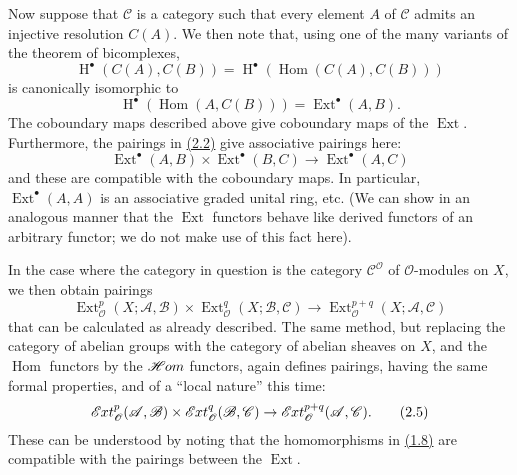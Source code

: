 \documentclass{article}
\newcommand{\oldpage}[1]{\marginpar{\footnotesize$\Big\vert$ \textit{p.~#1}}}
\theoremstyle{definition}
\theoremstyle{definition}
\theoremstyle{definition}
\theoremstyle{definition}
\theoremstyle{remark}
\begin{document}
\oldpage{149-04}Now suppose that \({\mathcal{C}}\) is a category such that every element \(A\) of \({\mathcal{C}}\) admits an injective resolution \(C(A)\).
We then note that, using one of the many variants of the theorem of bicomplexes,
\[
  \operatorname{H}^\bullet(C(A),C(B)) = \operatorname{H}^\bullet(\operatorname{Hom}(C(A),C(B)))
\]
is canonically isomorphic to
\[
  \operatorname{H}^\bullet(\operatorname{Hom}(A,C(B))) = \operatorname{Ext}^\bullet(A,B).
\]
The coboundary maps described above give coboundary maps of the \(\operatorname{Ext}\).
Furthermore, the pairings in \protect\hyperlink{fga-1-equation-2.2}{(2.2)} give associative pairings here:
\[
  \operatorname{Ext}^\bullet(A,B)\times\operatorname{Ext}^\bullet(B,C) \to \operatorname{Ext}^\bullet(A,C)
\tag{2.3}
\]
and these are compatible with the coboundary maps.
In particular, \(\operatorname{Ext}^\bullet(A,A)\) is an associative graded unital ring, etc.
(We can show in an analogous manner that the \(\operatorname{Ext}\) functors behave like derived functors of an arbitrary functor;
we do not make use of this fact here).

In the case where the category in question is the category \({\mathcal{C}}^{\mathscr{O}}\) of \({\mathscr{O}}\)-modules on \(X\), we then obtain pairings
\[
  \operatorname{Ext}_{\mathscr{O}}^p(X;{\mathscr{A}},{\mathscr{B}})\times\operatorname{Ext}_{\mathscr{O}}^q(X;{\mathscr{B}},{\mathscr{C}}) \to \operatorname{Ext}_{\mathscr{O}}^{p+q}(X;{\mathscr{A}},{\mathscr{C}})
\tag{2.4}
\]
that can be calculated as already described.
The same method, but replacing the category of abelian groups with the category of abelian sheaves on \(X\), and the \(\operatorname{Hom}\) functors by the \(\mathscr{H}\kern -.5pt om\) functors, again defines pairings, having the same formal properties, and of a ``local nature'' this time:
\[
  \mathscr{E}\kern -.5pt xt_{\mathscr{O}}^p({\mathscr{A}},{\mathscr{B}})\times\mathscr{E}\kern -.5pt xt_{\mathscr{O}}^q({\mathscr{B}},{\mathscr{C}}) \to \mathscr{E}\kern -.5pt xt_{\mathscr{O}}^{p+q}({\mathscr{A}},{\mathscr{C}}).
\tag{2.5}
\]
These can be understood by noting that the homomorphisms in \protect\hyperlink{fga-1-equation-1.8}{(1.8)} are compatible with the pairings between the \(\operatorname{Ext}\).
\end{document}
